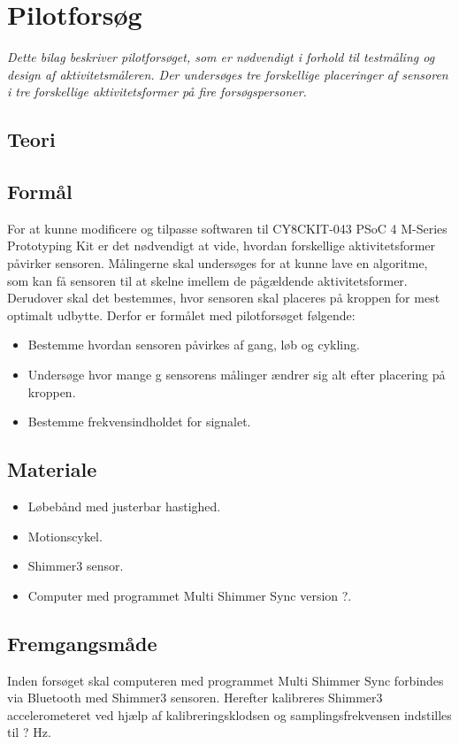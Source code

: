 \chapter{Pilotforsøg}
\textit{Dette bilag beskriver pilotforsøget, som er nødvendigt i forhold til testmåling og design af aktivitetsmåleren. Der undersøges tre forskellige placeringer af sensoren i tre forskellige aktivitetsformer på fire forsøgspersoner.}

\section{Teori}

\section{Formål}
For at kunne modificere og tilpasse softwaren til CY8CKIT-043 PSoC 4 M-Series Prototyping Kit er det nødvendigt at vide, hvordan forskellige aktivitetsformer påvirker sensoren. Målingerne skal undersøges for at kunne lave en algoritme, som kan få sensoren til at skelne imellem de pågældende aktivitetsformer. Derudover skal det bestemmes, hvor sensoren skal placeres på kroppen for mest optimalt udbytte. Derfor er formålet med pilotforsøget følgende:
\begin{itemize}
	\item Bestemme hvordan sensoren påvirkes af gang, løb og cykling.
	\item Undersøge hvor mange g sensorens målinger ændrer sig alt efter placering på kroppen.
	\item Bestemme frekvensindholdet for signalet.
\end{itemize}

\section{Materiale}
\begin{itemize}
	\item Løbebånd med justerbar hastighed. %
	\item Motionscykel.
	\item Shimmer3 sensor.
	\item Computer med programmet Multi Shimmer Sync version ?.
\end{itemize}

\section{Fremgangsmåde}
Inden forsøget skal computeren med programmet Multi Shimmer Sync forbindes via Bluetooth med Shimmer3 sensoren. Herefter kalibreres Shimmer3 accelerometeret ved hjælp af kalibreringsklodsen og samplingsfrekvensen indstilles til ? Hz.%



